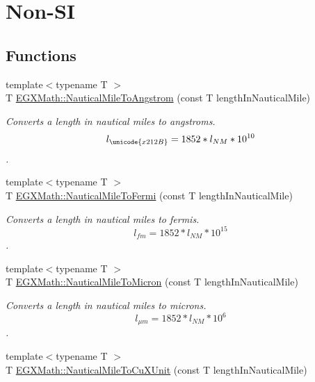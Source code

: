 \hypertarget{group___e_g_x_math-_conversions-_length_conversions-_non-_s_i-_nautical_mile-_non-_s_i}{}\section{Non-\/\+SI}
\label{group___e_g_x_math-_conversions-_length_conversions-_non-_s_i-_nautical_mile-_non-_s_i}
\subsection*{Functions}
\begin{DoxyCompactItemize}
\item 
{\footnotesize template$<$typename T $>$ }\\T \mbox{\hyperlink{group___e_g_x_math-_conversions-_length_conversions-_non-_s_i-_nautical_mile-_non-_s_i_ga6f451e4456d985c7d63b39a084b3dd23}{E\+G\+X\+Math\+::\+Nautical\+Mile\+To\+Angstrom}} (const T length\+In\+Nautical\+Mile)
\begin{DoxyCompactList}\small\item\em Converts a length in nautical miles to angstroms. \[ l_{\unicode{x212B}}=1852 * l_{NM} * 10^{10} \]. \end{DoxyCompactList}\item 
{\footnotesize template$<$typename T $>$ }\\T \mbox{\hyperlink{group___e_g_x_math-_conversions-_length_conversions-_non-_s_i-_nautical_mile-_non-_s_i_gaa4b84422943c37e49e5c3abdc7f301e4}{E\+G\+X\+Math\+::\+Nautical\+Mile\+To\+Fermi}} (const T length\+In\+Nautical\+Mile)
\begin{DoxyCompactList}\small\item\em Converts a length in nautical miles to fermis. \[ l_{fm}=1852 * l_{NM} * 10^{15} \]. \end{DoxyCompactList}\item 
{\footnotesize template$<$typename T $>$ }\\T \mbox{\hyperlink{group___e_g_x_math-_conversions-_length_conversions-_non-_s_i-_nautical_mile-_non-_s_i_gad80a4f8f82660ad19a420e55bfb33447}{E\+G\+X\+Math\+::\+Nautical\+Mile\+To\+Micron}} (const T length\+In\+Nautical\+Mile)
\begin{DoxyCompactList}\small\item\em Converts a length in nautical miles to microns. \[ l_{\mu m}=1852 * l_{NM} * 10^{6} \]. \end{DoxyCompactList}\item 
{\footnotesize template$<$typename T $>$ }\\T \mbox{\hyperlink{group___e_g_x_math-_conversions-_length_conversions-_non-_s_i-_nautical_mile-_non-_s_i_gaa0638917756d520cfc0877dcde60d777}{E\+G\+X\+Math\+::\+Nautical\+Mile\+To\+Cu\+X\+Unit}} (const T length\+In\+Nautical\+Mile)

\end{DoxyCompactItemize}
